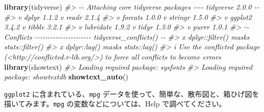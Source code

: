 \documentclass[
  xelatex, ja=standard]{bxjsbook}
\newenvironment{Shaded}{\begin{snugshade}}{\end{snugshade}}
\newcommand{\CommentTok}[1]{\textcolor[rgb]{0.56,0.35,0.01}{\textit{#1}}}
\newcommand{\FunctionTok}[1]{\textcolor[rgb]{0.13,0.29,0.53}{\textbf{#1}}}
\newcommand{\NormalTok}[1]{#1}
\theoremstyle{definition}
\theoremstyle{definition}
\theoremstyle{definition}
\theoremstyle{definition}
\theoremstyle{remark}
\begin{document}
\begin{Shaded}
\begin{Highlighting}[]
\FunctionTok{library}\NormalTok{(tidyverse)}
\CommentTok{\#\textgreater{} {-}{-} Attaching core tidyverse packages {-}{-}{-}{-} tidyverse 2.0.0 {-}{-}}
\CommentTok{\#\textgreater{} v dplyr     1.1.2     v readr     2.1.4}
\CommentTok{\#\textgreater{} v forcats   1.0.0     v stringr   1.5.0}
\CommentTok{\#\textgreater{} v ggplot2   3.4.2     v tibble    3.2.1}
\CommentTok{\#\textgreater{} v lubridate 1.9.2     v tidyr     1.3.0}
\CommentTok{\#\textgreater{} v purrr     1.0.1     }
\CommentTok{\#\textgreater{} {-}{-} Conflicts {-}{-}{-}{-}{-}{-}{-}{-}{-}{-}{-}{-}{-}{-}{-}{-}{-}{-}{-}{-}{-}{-} tidyverse\_conflicts() {-}{-}}
\CommentTok{\#\textgreater{} x dplyr::filter() masks stats::filter()}
\CommentTok{\#\textgreater{} x dplyr::lag()    masks stats::lag()}
\CommentTok{\#\textgreater{} i Use the conflicted package (\textless{}http://conflicted.r{-}lib.org/\textgreater{}) to force all conflicts to become errors}
\FunctionTok{library}\NormalTok{(showtext) }
\CommentTok{\#\textgreater{} Loading required package: sysfonts}
\CommentTok{\#\textgreater{} Loading required package: showtextdb}
\FunctionTok{showtext\_auto}\NormalTok{()}
\end{Highlighting}
\end{Shaded}

\texttt{ggplot2} に含まれている、\texttt{mpg} データを使って、簡単な、散布図と、箱ひげ図を描いてみます。\texttt{mpg} の変数などについては、Help で調べてください。

\begin{Shaded}
\end{Shaded}
\end{document}
